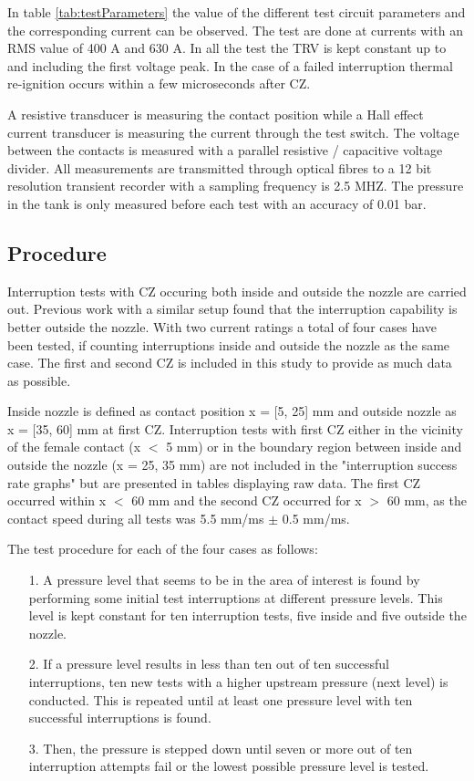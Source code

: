 \documentclass[10pt,a4paper]{article} %
\begin{document}
In table \ref{tab:testParameters} the value of the different test circuit parameters and the corresponding current can be observed. The test are done at currents with an RMS value of 400 A and 630 A. In all the test the TRV is kept constant up to and including the first voltage peak. In the case of a failed interruption thermal re-ignition occurs within a few microseconds after CZ.

A resistive transducer is measuring the contact position while a Hall effect current transducer is measuring the current through the test switch. The voltage between the contacts is measured with a parallel resistive / capacitive voltage divider. All measurements are transmitted through optical fibres to a 12 bit resolution transient recorder with a sampling frequency is 2.5 MHZ. The pressure in the tank is only measured before each test with an accuracy of 0.01 bar.

\subsection{Procedure} \label{sec:procedure}
Interruption tests with CZ occuring both inside and outside the nozzle are carried out. Previous work with a similar setup found that the interruption capability is better outside the nozzle. With two current ratings a total of four cases have been tested, if counting interruptions inside and outside the nozzle as the same case. The first and second CZ is included in this study to provide as much data as possible.

Inside nozzle is defined as contact position x = [5, 25] mm and outside nozzle as x = [35, 60] mm at first CZ. Interruption tests with first CZ either in the vicinity of the female contact (x $<$ 5 mm) or in the boundary region between inside and outside the nozzle (x = 25, 35 mm) are not included in the "interruption success rate graphs" but are presented in tables displaying raw data. The first CZ occurred within x $<$ 60 mm and the second CZ occurred for x $>$ 60 mm, as the contact speed during all tests was 5.5 mm/ms $\pm$ 0.5 mm/ms.

The test procedure for each of the four cases as follows: 
\begin{itemize}
\item[1.] A pressure level that seems to be in the area of interest is found by performing some initial test interruptions at different pressure levels. This level is kept constant for ten interruption tests, five inside and five outside the nozzle.
\item[2.] If a pressure level results in less than ten out of ten successful interruptions, ten new tests with a higher upstream pressure (next level) is conducted. This is repeated until at least one pressure level with ten successful interruptions is found.
\item[3.] Then, the pressure is stepped down until seven or more out of ten interruption attempts fail or the lowest possible pressure level is tested.
\end{itemize}
\end{document}
